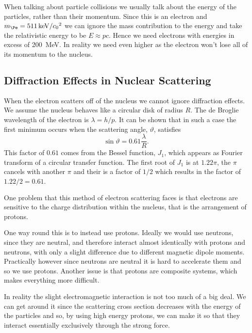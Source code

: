 \documentclass[fleqn]{NotesClass}
\begin{document}
    When talking about particle collisions we usually talk about the energy of the particles, rather than their momentum.
    Since this is an electron and \(m_{\Pe} = \qty[per-mode=symbol]{511}{\kilo\electronvolt\per\clight\squared}\) we can ignore the mass contribution to the energy and take the relativistic energy to be \(E \approx pc\).
    Hence we need electrons with energies in excess of \qty{200}{\MeV}.
    In reality we need even higher as the electron won't lose all of its momentum to the nucleus.
    
    \subsection{Diffraction Effects in Nuclear Scattering}
    When the electron scatters off of the nucleus we cannot ignore diffraction effects.
    We assume the nucleus behaves like a circular disk of radius \(R\).
    The de Broglie wavelength of the electron is \(\lambda = h/p\).
    It can be shown that in such a case the first minimum occurs when the scattering angle, \(\vartheta\), satisfies
    \begin{equation}
        \sin\vartheta = 0.61\frac{\lambda}{R}.
    \end{equation}
    This factor of \(0.61\) comes from the Bessel function, \(J_1\), which appears as Fourier transform of a circular transfer function.
    The first root of \(J_1\) is at \(1.22\pi\), the \(\pi\) cancels with another \(\pi\) and their is a factor of \(1/2\) which results in the factor of \(1.22/2 = 0.61\).
    
    One problem that this method of electron scattering faces is that electrons are sensitive to the charge distribution within the nucleus, that is the arrangement of protons.
    
    One way round this is to instead use protons.
    Ideally we would use neutrons, since they are neutral, and therefore interact almost identically with protons and neutrons, with only a slight difference due to different magnetic dipole moments.
    Practically however since neutrons are neutral it is hard to accelerate them and so we use protons.
    Another issue is that protons are composite systems, which makes everything more difficult.
    
    In reality the slight electromagnetic interaction is not too much of a big deal. 
    We can get around it since the scattering cross section decreases with the energy of the particles and so, by using high energy protons, we can make it so that they interact essentially exclusively through the strong force.
    
\end{document}
